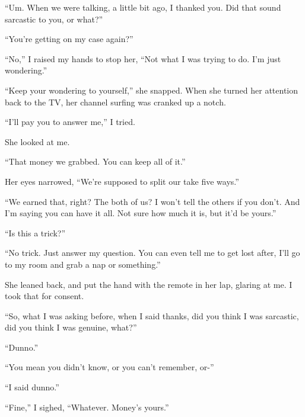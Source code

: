 ``Um.  When we were talking, a little bit ago, I thanked you.  Did that sound sarcastic to you, or what?''



``You're getting on my case again?''



``No,'' I raised my hands to stop her, ``Not what I was trying to do.  I'm just wondering.''



``Keep your wondering to yourself,'' she snapped.  When she turned her attention back to the TV, her channel surfing was cranked up a notch.



``I'll pay you to answer me,'' I tried.



She looked at me.



``That money we grabbed.  You can keep all of it.''



Her eyes narrowed, ``We're supposed to split our take five ways.''



``We earned that, right?  The both of us?  I won't tell the others if you don't. And I'm saying you can have it all.  Not sure how much it is, but it'd be yours.''



``Is this a trick?''



``No trick.  Just answer my question.  You can even tell me to get lost after, I'll go to my room and grab a nap or something.''



She leaned back, and put the hand with the remote in her lap, glaring at me.  I took that for consent.



``So, what I was asking before, when I said thanks, did you think I was sarcastic, did you think I was genuine, what?''



``Dunno.''



``You mean you didn't know, or you can't remember, or-''



``I said dunno.''



``Fine,'' I sighed, ``Whatever.  Money's yours.''



